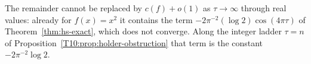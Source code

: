 The remainder cannot be replaced by $c(f)+o(1)$ as $\tau\to\infty$ through
real values: already for $f(x)=x^2$ it contains the term
$-2\pi^{-2}(\log2)\cos(4\pi\tau)$ of Theorem~\ref{thm:hs-exact}, which does
not converge.  Along the integer ladder $\tau=n$ of
Proposition~\ref{T10:prop:holder-obstruction} that term is the constant
$-2\pi^{-2}\log2$.

